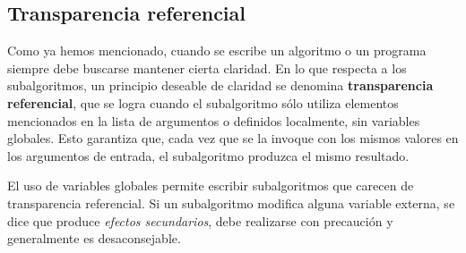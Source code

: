 \documentclass[]{book}
\begin{document}
\subsection{Transparencia referencial}\label{transparencia-referencial}

Como ya hemos mencionado, cuando se escribe un algoritmo o un programa
siempre debe buscarse mantener cierta claridad. En lo que respecta a los
subalgoritmos, un principio deseable de claridad se denomina
\textbf{transparencia referencial}, que se logra cuando el subalgoritmo
sólo utiliza elementos mencionados en la lista de argumentos o definidos
localmente, sin variables globales. Esto garantiza que, cada vez que se
la invoque con los mismos valores en los argumentos de entrada, el
subalgoritmo produzca el mismo resultado.

El uso de variables globales permite escribir subalgoritmos que carecen
de transparencia referencial. Si un subalgoritmo modifica alguna
variable externa, se dice que produce \emph{efectos secundarios}, debe
realizarse con precaución y generalmente es desaconsejable.


\end{document}
